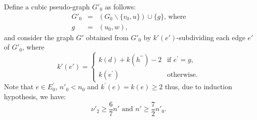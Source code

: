 \documentclass[fleqn,12pt,twoside]{article}
\newenvironment{proof}[1][Proof.]{\begin{trivlist}
\item[\hskip \labelsep {\bfseries #1}]}{\end{trivlist}}
\begin{document}
\begin{proof}
Define a cubic pseudo-graph $G'_{0}$ as follows:\begin{eqnarray*}
G'_{0}&=&(G_{0}\backslash \{v_{0},u\})\cup \{g\}\text{, where} \\
g &=&(u_{0},w)\text{,}
\end{eqnarray*}and consider the graph $G'$ obtained from $G'_{0}$ by $k'(e')$-subdividing each edge $e'$ of $G'_{0}$, where
\begin{equation*}
k'(e')=\left\{
\begin{array}{ll}
k(d)+k(h^{\prime \prime })-2 & \text{if }e^{\prime }=g\text{,} \\
k(e^{\prime }) & \text{otherwise.}\end{array}\right.
\end{equation*}Note that $e\in E_{0}^{\prime }$, $n'_0 <n_0$ and $k^{\prime
}(e)=k(e)\geq
2$ thus, due to induction hypothesis, we have:\begin{equation}
\nu' _{2}\geq \frac{6}{7}n' \text{ and }n' \geq \frac{7}{2}n'_0.
\label{Induction6-7}
\end{equation}


\end{proof}
\end{document}
